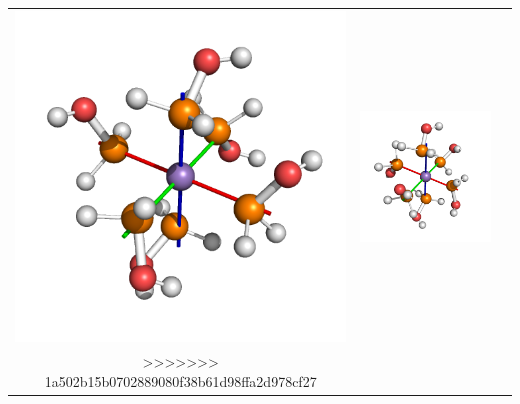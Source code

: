 \documentclass[12pt,tikz]{report}
\begin{document}
\begin{tabular}{|c|c|c|}
\\ \hline 
\includegraphics{../final/final_render1.png}
&  
\includegraphics{../final/final_render2.png}
\\
>>>>>>> 1a502b15b0702889080f38b61d98ffa2d978cf27
\hline
\end{tabular}
\\

\end{document}
